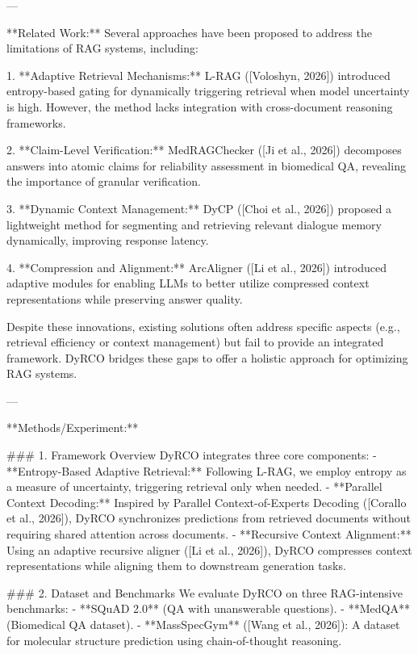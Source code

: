 ---

**Related Work:**  
Several approaches have been proposed to address the limitations of RAG systems, including:  

1. **Adaptive Retrieval Mechanisms:**  
   L-RAG ([Voloshyn, 2026]) introduced entropy-based gating for dynamically triggering retrieval when model uncertainty is high. However, the method lacks integration with cross-document reasoning frameworks.  

2. **Claim-Level Verification:**  
   MedRAGChecker ([Ji et al., 2026]) decomposes answers into atomic claims for reliability assessment in biomedical QA, revealing the importance of granular verification.  

3. **Dynamic Context Management:**  
   DyCP ([Choi et al., 2026]) proposed a lightweight method for segmenting and retrieving relevant dialogue memory dynamically, improving response latency.  

4. **Compression and Alignment:**  
   ArcAligner ([Li et al., 2026]) introduced adaptive modules for enabling LLMs to better utilize compressed context representations while preserving answer quality.  

Despite these innovations, existing solutions often address specific aspects (e.g., retrieval efficiency or context management) but fail to provide an integrated framework. DyRCO bridges these gaps to offer a holistic approach for optimizing RAG systems.  

---

**Methods/Experiment:**  

### 1. Framework Overview  
DyRCO integrates three core components:  
- **Entropy-Based Adaptive Retrieval:** Following L-RAG, we employ entropy as a measure of uncertainty, triggering retrieval only when needed.  
- **Parallel Context Decoding:** Inspired by Parallel Context-of-Experts Decoding ([Corallo et al., 2026]), DyRCO synchronizes predictions from retrieved documents without requiring shared attention across documents.  
- **Recursive Context Alignment:** Using an adaptive recursive aligner ([Li et al., 2026]), DyRCO compresses context representations while aligning them to downstream generation tasks.  

### 2. Dataset and Benchmarks  
We evaluate DyRCO on three RAG-intensive benchmarks:  
- **SQuAD 2.0** (QA with unanswerable questions).  
- **MedQA** (Biomedical QA dataset).  
- **MassSpecGym** ([Wang et al., 2026]): A dataset for molecular structure prediction using chain-of-thought reasoning.  

